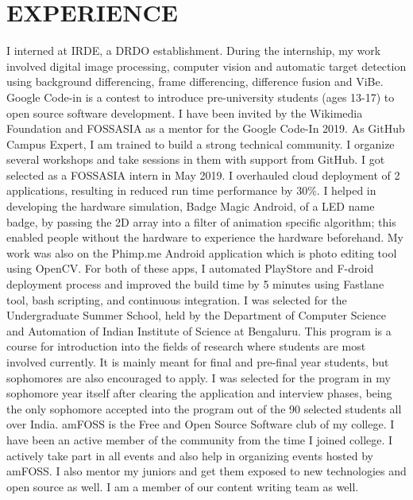 \documentclass[11pt,a4paper,sans]{moderncv}        %
\begin{document}
\section{EXPERIENCE}
{I interned at IRDE, a DRDO establishment. During the internship, my work involved digital image processing, computer vision and automatic target detection using background differencing, frame differencing, difference fusion and ViBe.}
{Google Code-in is a contest to introduce pre-university students (ages 13-17) to open source software development. I have been invited by the Wikimedia Foundation and FOSSASIA as a mentor for the Google Code-In 2019.}
{As GitHub Campus Expert, I am trained to build a strong technical community. I organize several workshops and take sessions in them with support from GitHub.}
{I got selected as a FOSSASIA intern in  May 2019. I overhauled cloud deployment of 2 applications, resulting in reduced run time performance by 30\%. I helped in developing the hardware simulation, Badge Magic Android, of a LED name badge, by passing the 2D array into a filter of animation specific algorithm; this enabled people without the hardware to experience the hardware beforehand. My work was also on the Phimp.me Android application which is photo editing tool using OpenCV. For both of these apps, I automated PlayStore and F-droid deployment process and improved the build time by 5 minutes using Fastlane tool, bash scripting, and continuous integration.}{}  %
{I was selected for the Undergraduate Summer School, held by the Department of Computer Science and Automation of Indian Institute of Science at Bengaluru. This program is a course for introduction into the fields of research where students are most involved currently. It is mainly meant for final and pre-final year students, but sophomores are also encouraged to apply. I was selected for the program in my sophomore year itself after clearing the application and interview phases, being the only sophomore accepted into the program out of the 90 selected students all over India.}{}  %
{amFOSS is the Free and Open Source Software club  of my college. I have been an active member of the community from the time I joined college. I actively take part in all events and also help in organizing events hosted by amFOSS. I also mentor my juniors and get them exposed to new technologies and open source as well. I am a member of our content writing team as well.}
\end{document}
